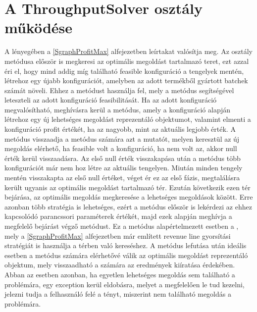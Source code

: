 \section{A ThroughputSolver osztály működése} \label{throughput_solver}
A  lényegében a \ref{SgraphProfitMax} alfejezetben leírtakat valósítja meg.
Az osztály  metódusa először is megkeresi az optimális megoldást tartalmazó teret, ezt azzal éri el, hogy mind addig míg található feasible konfiguráció a tengelyek mentén, létrehoz egy újabb konfigurációt, amelyben az adott termékből gyártott batchek számát növeli.
Ehhez a  metódust használja fel, mely a  metódus segítségével leteszteli az adott konfiguráció feasibilitását.
Ha az adott konfiguráció megvalósítható, meghívásra kerül a  metódus, amely a konfiguráció alapján létrehoz egy új lehetséges megoldást reprezentáló objektumot, valamint elmenti a konfiguráció profit értékét, ha az nagyobb, mint az aktuális legjobb érték.
A  metódus visszaadja a  metódus számára azt a mutatót, melyen keresztül az új megoldás elérhető, ha feasible volt a konfiguráció, ha nem volt az, akkor null érték kerül visszaadásra.
Az első null érték visszakapása után a  metódus több konfigurációt már nem hoz létre az aktuális tengelyen.
Miután minden tengely mentén visszakapta az első null értéket, véget ér ez az első fázis, megtalálásra került ugyanis az optimális megoldást tartalmazó tér.
Ezután következik ezen tér bejárása, az optimális megoldás megkeresése a lehetséges megoldások között.
Erre azonban több stratégia is lehetséges, ezért a  metódus először is lekérdezi az ehhez kapcsolódó parancssori paraméterek értékét, majd ezek alapján meghívja a megfelelő bejárást végző metódust.
Ez a metódus alapértelmezett esetben a , mely a \ref{SgraphProfitMax} alfejezetben már említett revenue line gyorsítási stratégiát is használja a térben való kereséshez.
A metódus lefutása után ideális esetben a  metódus számára elérhetővé válik az optimális megoldást reprezentáló objektum, mely visszaadható a  számára az eredmények kiíratása érdekében.
Abban az esetben azonban, ha egyetlen lehetséges megoldás sem található a problémára, egy exception kerül eldobásra, melyet a  megfelelően le tud kezelni, jelezni tudja a felhasználó felé a tényt, miszerint nem található megoldás a problémára.